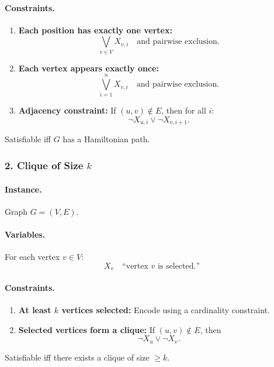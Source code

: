 \documentclass{article}
\begin{document}
\paragraph{Constraints.}

\begin{enumerate}
    \item \textbf{Each position has exactly one vertex:}
    \[
    \bigvee_{v \in V} X_{v,i}
    \quad\text{and pairwise exclusion.}
    \]
    \item \textbf{Each vertex appears exactly once:}
    \[
    \bigvee_{i=1}^{n} X_{v,i}
    \quad\text{and pairwise exclusion.}
    \]
    \item \textbf{Adjacency constraint:}
    If $(u,v) \notin E$, then for all $i$:
    \[
    \neg X_{u,i} \lor \neg X_{v,i+1}.
    \]
\end{enumerate}

Satisfiable iff $G$ has a Hamiltonian path.

\bigskip

\subsubsection*{2. Clique of Size $k$}

\paragraph{Instance.}
Graph $G=(V,E)$.

\paragraph{Variables.}
For each vertex $v \in V$:
\[
X_v \quad \text{``vertex $v$ is selected.''}
\]

\paragraph{Constraints.}

\begin{enumerate}
    \item \textbf{At least $k$ vertices selected:}
    Encode using a cardinality constraint.
    \item \textbf{Selected vertices form a clique:}
    If $(u,v) \notin E$, then
    \[
    \neg X_u \lor \neg X_v.
    \]
\end{enumerate}

Satisfiable iff there exists a clique of size $\ge k$.
\end{document}
